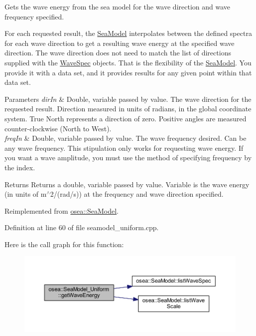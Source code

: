Gets the wave energy from the sea model for the wave direction and wave frequency specified. 

For each requested result, the \hyperlink{classosea_1_1_sea_model}{Sea\-Model} interpolates between the defined spectra for each wave direction to get a resulting wave energy at the specified wave direction. The wave direction does not need to match the list of directions supplied with the \hyperlink{classosea_1_1_wave_spec}{Wave\-Spec} objects. That is the flexibility of the \hyperlink{classosea_1_1_sea_model}{Sea\-Model}. You provide it with a data set, and it provides results for any given point within that data set. 
\begin{DoxyParams}{Parameters}
{\em dir\-In} & Double, variable passed by value. The wave direction for the requested result. Direction measured in units of radians, in the global coordinate system. True North represents a direction of zero. Positive angles are measured counter-\/clockwise (North to West). \\
\hline
{\em freq\-In} & Double, variable passed by value. The wave frequency desired. Can be any wave frequency. This stipulation only works for requesting wave energy. If you want a wave amplitude, you must use the method of specifying frequency by the index. \\
\hline
\end{DoxyParams}
\begin{DoxyReturn}{Returns}
Returns a double, variable passed by value. Variable is the wave energy (in units of m$^\wedge$2/(rad/s)) at the frequency and wave direction specified. 
\end{DoxyReturn}


Reimplemented from \hyperlink{classosea_1_1_sea_model_abd444caa08206c2f3b2002e614f0b2fc}{osea\-::\-Sea\-Model}.



Definition at line 60 of file seamodel\-\_\-uniform.\-cpp.



Here is the call graph for this function\-:
\nopagebreak
\begin{figure}[H]
\begin{center}
\leavevmode
\includegraphics[width=350pt]{classosea_1_1_sea_model___uniform_af8db8287e12f25665405bc3fcf93c01e_cgraph}
\end{center}
\end{figure}




